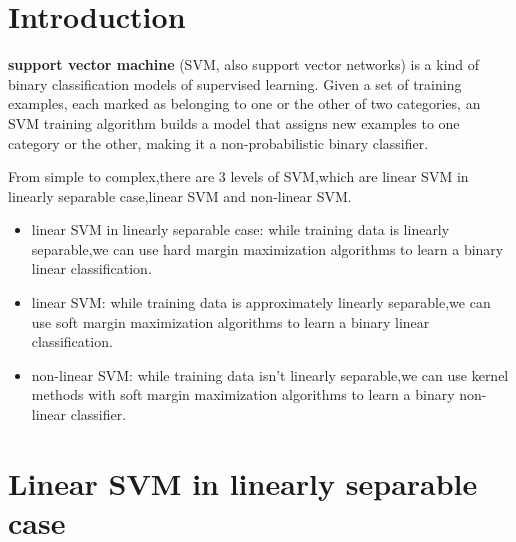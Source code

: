 \section{Introduction}
\textbf{support vector machine} (SVM, also support vector networks) is a kind of binary classification models of supervised learning. Given a set of training examples, each marked as belonging to one or the other of two categories, an SVM training algorithm builds a model that assigns new examples to one category or the other, making it a non-probabilistic binary classifier.
\par From simple to complex,there are 3 levels of SVM,which are linear SVM in linearly separable case,linear SVM and non-linear SVM.
\begin{itemize}
  \item linear SVM in linearly separable case: while training data is linearly separable,we can use hard margin maximization algorithms to learn a binary linear classification.
  \item linear SVM: while training data is approximately linearly separable,we can use soft margin maximization algorithms to learn a binary linear classification.
  \item non-linear SVM: while training data isn't linearly separable,we can use kernel methods with soft margin maximization algorithms to learn a binary non-linear classifier.
\end{itemize}


\section{Linear SVM in linearly separable case}
